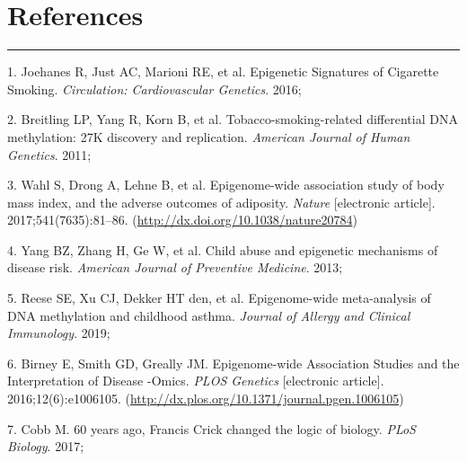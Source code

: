 \documentclass[11pt,oneside]{bristolthesis}
\newenvironment{cslreferences}%
  {}%
  {\par}
\begin{document}
\backmatter

\hypertarget{references}{%
\chapter*{References}\label{references}}


\noindent

\setlength{\parindent}{-0.20in}
\setlength{\leftskip}{0.20in}
\setlength{\parskip}{8pt}
\begin{center}\rule{0.5\linewidth}{0.5pt}\end{center}

\hypertarget{refs}{}
\begin{cslreferences}
\leavevmode\hypertarget{ref-Joehanes2016}{}%
1. Joehanes R, Just AC, Marioni RE, et al. Epigenetic Signatures of Cigarette Smoking. \emph{Circulation: Cardiovascular Genetics}. 2016;

\leavevmode\hypertarget{ref-Breitling2011}{}%
2. Breitling LP, Yang R, Korn B, et al. Tobacco-smoking-related differential DNA methylation: 27K discovery and replication. \emph{American Journal of Human Genetics}. 2011;

\leavevmode\hypertarget{ref-Wahl2017}{}%
3. Wahl S, Drong A, Lehne B, et al. Epigenome-wide association study of body mass index, and the adverse outcomes of adiposity. \emph{Nature} {[}electronic article{]}. 2017;541(7635):81--86. (\url{http://dx.doi.org/10.1038/nature20784})

\leavevmode\hypertarget{ref-Yang2013}{}%
4. Yang BZ, Zhang H, Ge W, et al. Child abuse and epigenetic mechanisms of disease risk. \emph{American Journal of Preventive Medicine}. 2013;

\leavevmode\hypertarget{ref-Reese2019}{}%
5. Reese SE, Xu CJ, Dekker HT den, et al. Epigenome-wide meta-analysis of DNA methylation and childhood asthma. \emph{Journal of Allergy and Clinical Immunology}. 2019;

\leavevmode\hypertarget{ref-Birney2016}{}%
6. Birney E, Smith GD, Greally JM. Epigenome-wide Association Studies and the Interpretation of Disease -Omics. \emph{PLOS Genetics} {[}electronic article{]}. 2016;12(6):e1006105. (\url{http://dx.plos.org/10.1371/journal.pgen.1006105})

\leavevmode\hypertarget{ref-Cobb2017}{}%
7. Cobb M. 60 years ago, Francis Crick changed the logic of biology. \emph{PLoS Biology}. 2017;


\end{cslreferences}
\end{document}
